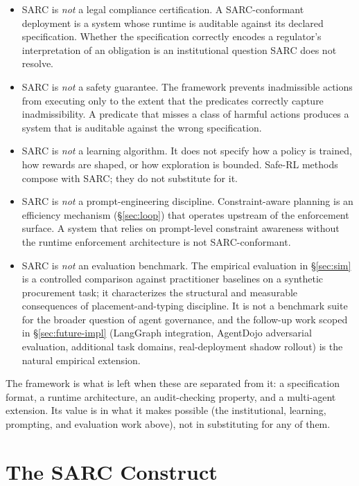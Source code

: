 \documentclass[11pt,a4paper]{article}
\theoremstyle{remark}
\begin{document}
\begin{itemize}[leftmargin=2em,topsep=0.3em,itemsep=0.3em]
\item SARC is \emph{not} a legal compliance certification. A SARC-conformant deployment is a system whose runtime is auditable against its declared specification. Whether the specification correctly encodes a regulator's interpretation of an obligation is an institutional question SARC does not resolve.
\item SARC is \emph{not} a safety guarantee. The framework prevents inadmissible actions from executing only to the extent that the predicates correctly capture inadmissibility. A predicate that misses a class of harmful actions produces a system that is auditable against the wrong specification.
\item SARC is \emph{not} a learning algorithm. It does not specify how a policy is trained, how rewards are shaped, or how exploration is bounded. Safe-RL methods compose with SARC; they do not substitute for it.
\item SARC is \emph{not} a prompt-engineering discipline. Constraint-aware planning is an efficiency mechanism (\S\ref{sec:loop}) that operates upstream of the enforcement surface. A system that relies on prompt-level constraint awareness without the runtime enforcement architecture is not SARC-conformant.
\item SARC is \emph{not} an evaluation benchmark. The empirical evaluation in \S\ref{sec:sim} is a controlled comparison against practitioner baselines on a synthetic procurement task; it characterizes the structural and measurable consequences of placement-and-typing discipline. It is not a benchmark suite for the broader question of agent governance, and the follow-up work scoped in \S\ref{sec:future-impl} (LangGraph integration, AgentDojo adversarial evaluation, additional task domains, real-deployment shadow rollout) is the natural empirical extension.
\end{itemize}

The framework is what is left when these are separated from it: a specification format, a runtime architecture, an audit-checking property, and a multi-agent extension. Its value is in what it makes possible (the institutional, learning, prompting, and evaluation work above), not in substituting for any of them.

\section{The SARC Construct}\label{sec:def}
\end{document}
